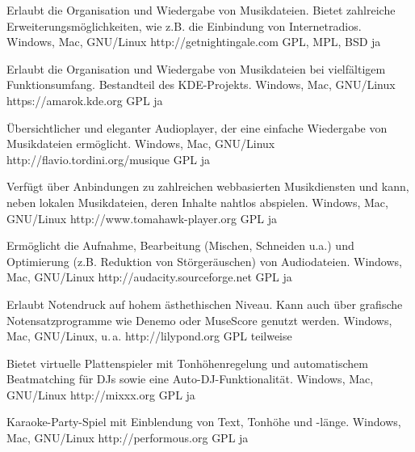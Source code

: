 





{Erlaubt die Organisation und Wiedergabe von Musikdateien. Bietet zahlreiche Erweiterungsmöglichkeiten, wie z.B. die Einbindung von Internetradios.}
{Windows, Mac, GNU/Linux}
{http://getnightingale.com}
{GPL, MPL, BSD}
{ja}

{Erlaubt die Organisation und Wiedergabe von Musikdateien bei vielfältigem Funktionsumfang. Bestandteil des KDE-Projekts.}
{Windows, Mac, GNU/Linux}
{https://amarok.kde.org}
{GPL}
{ja}

{Übersichtlicher und eleganter Audioplayer, der eine einfache Wiedergabe von Musikdateien ermöglicht.}
{Windows, Mac, GNU/Linux}
{http://flavio.tordini.org/musique}
{GPL}
{ja}

{Verfügt über Anbindungen zu zahlreichen webbasierten Musikdiensten und kann, neben lokalen Musikdateien, deren Inhalte nahtlos abspielen.}
{Windows, Mac, GNU/Linux}
{http://www.tomahawk-player.org}  %
{GPL}
{ja}

{Ermöglicht die Aufnahme, Bearbeitung (Mischen, Schneiden u.a.) und Optimierung (z.B. Reduktion von Störgeräuschen) von Audiodateien.}
{Windows, Mac, GNU/Linux}
{http://audacity.sourceforge.net}
{GPL}
{ja}

{Erlaubt Notendruck auf hohem ästhethischen Niveau. Kann auch über grafische Notensatzprogramme wie Denemo oder MuseScore genutzt werden.}
{Windows, Mac, GNU/Linux, u.\,a.}
{http://lilypond.org}
{GPL}
{teilweise}

{Bietet virtuelle Plattenspieler mit Tonhöhenregelung und automatischem Beatmatching für DJs sowie eine Auto-DJ-Funktionalität.}
{Windows, Mac, GNU/Linux}
{http://mixxx.org}
{GPL}
{ja}

{Karaoke-Party-Spiel mit Einblendung von Text, Tonhöhe und -länge.}
{Windows, Mac, GNU/Linux}
{http://performous.org}
{GPL}
{ja}


\backpage


